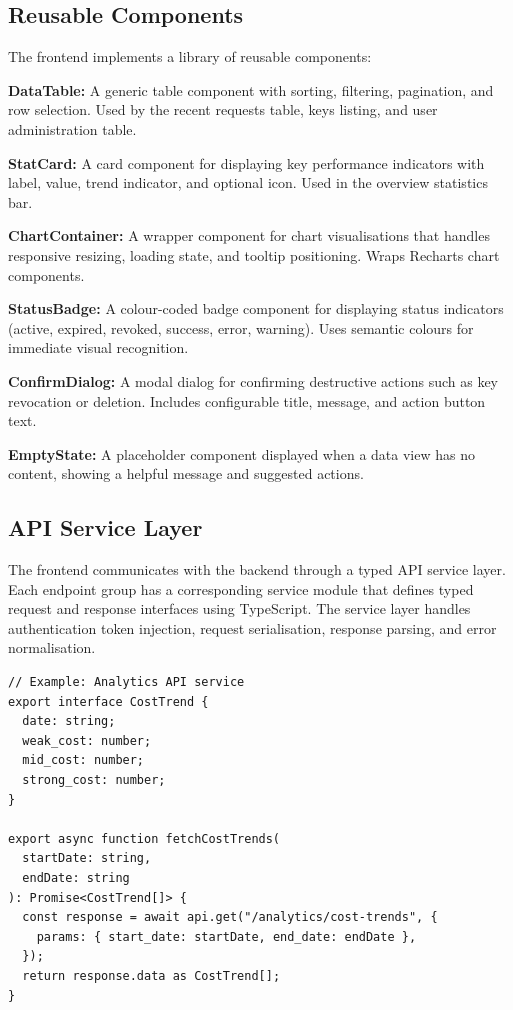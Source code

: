 \documentclass[oneside,12pt,a4paper]{report}
\begin{document}
\subsection{Reusable Components}

The frontend implements a library of reusable components:

\textbf{DataTable:} A generic table component with sorting, filtering, pagination, and row selection. Used by the recent requests table, keys listing, and user administration table.

\textbf{StatCard:} A card component for displaying key performance indicators with label, value, trend indicator, and optional icon. Used in the overview statistics bar.

\textbf{ChartContainer:} A wrapper component for chart visualisations that handles responsive resizing, loading state, and tooltip positioning. Wraps Recharts chart components.

\textbf{StatusBadge:} A colour-coded badge component for displaying status indicators (active, expired, revoked, success, error, warning). Uses semantic colours for immediate visual recognition.

\textbf{ConfirmDialog:} A modal dialog for confirming destructive actions such as key revocation or deletion. Includes configurable title, message, and action button text.

\textbf{EmptyState:} A placeholder component displayed when a data view has no content, showing a helpful message and suggested actions.

\subsection{API Service Layer}

The frontend communicates with the backend through a typed API service layer. Each endpoint group has a corresponding service module that defines typed request and response interfaces using TypeScript. The service layer handles authentication token injection, request serialisation, response parsing, and error normalisation.

\begin{lstlisting}[caption=Frontend API service example, language={},basicstyle=\ttfamily\footnotesize]
// Example: Analytics API service
export interface CostTrend {
  date: string;
  weak_cost: number;
  mid_cost: number;
  strong_cost: number;
}

export async function fetchCostTrends(
  startDate: string,
  endDate: string
): Promise<CostTrend[]> {
  const response = await api.get("/analytics/cost-trends", {
    params: { start_date: startDate, end_date: endDate },
  });
  return response.data as CostTrend[];
}
\end{lstlisting}
\end{document}
